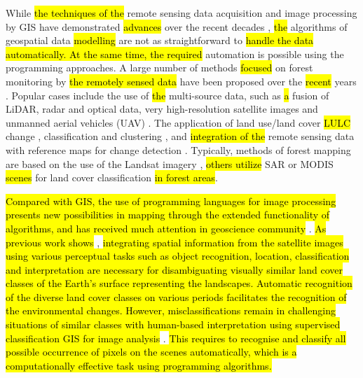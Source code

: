 \documentclass[applsci,article,submit,pdftex,moreauthors]{Definitions/mdpi}
\begin{document}
While \hl{the techniques of the} remote sensing data acquisition\hl{ }and\hl{ }image processing by GIS have demonstrated \hl{advances} over the recent decades \cite{CHUMA2021100083,Westmanetal1989}, \hl{the} algorithms of\hl{ }geospatial data\hl{ modelling} are not as straightforward to \hl{handle the data automatically. At the same time, the required} automation is possible using the programming approaches. A large number of methods \hl{focused} on forest monitoring by\hl{ the remotely sensed data} have been proposed over the \hl{recent} years \cite{6350700,773475,PU2019268,6049235,OHMANN20143}. Popular cases include the use of \hl{the} multi-source data, such as \hl{a} fusion of LiDAR, radar and optical data, very high-resolution satellite images and unmanned aerial vehicles (UAV) \cite{rs12071087}. The application of land use/land cover \hl{LULC} change \cite{lambin2003dynamics}, classification and clustering \cite{976841}, and \hl{integration of the} remote sensing data with reference maps for change detection \cite{rs14164126}. Typically, methods of forest mapping are based on the use of the Landsat imagery \cite{1294510,Zhangetal2006,KIM2014178}, \hl{others utilize} SAR \cite{rs11242999,858324,7326669,6352093,8035264} or MODIS \hl{scenes} \cite{HANSEN20082495,ZHANG201974} for\hl{ }land cover classification \hl{in forest areas}. 

\hl{Compared with GIS, the use of programming languages for image processing presents new possibilities in mapping through the extended functionality of algorithms, and has received much attention in geoscience community} \cite{TRUJILLOJIMENEZ2022100703,VANSTRIEN2022105462,RODRIGUES2022711,5981114,ROBERTS2022105192}. \hl{As previous work shows} \cite{LIAQAT2021100587,ASUQUOENOH2022,RAWAT201577}, \hl{integrating spatial information from the satellite images using various perceptual tasks such as object recognition, location, classification and interpretation are necessary for disambiguating visually similar land cover classes of the Earth's surface representing the landscapes. Automatic recognition of the diverse land cover classes on various periods facilitates the recognition of the environmental changes. However, misclassifications remain in challenging situations of similar classes with human-based interpretation using supervised classification GIS for image analysis} \cite{HUSSAIN2022103117,ABDELSADEK2022815,HEDAYATI202273}. \hl{This requires to recognise and classify all possible occurrence of pixels on the scenes automatically, which is a computationally effective task using programming algorithms.}
\end{document}

